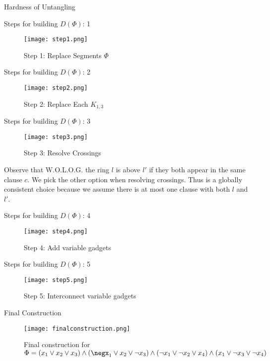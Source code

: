 \documentclass{beamer}
\begin{document}
\begin{section}{Hardness of Untangling}
    \begin{frame}{Steps for building $D(\Phi)$: 1}
        \begin{figure}
            \texttt{[image: step1.png]}
            \caption{Step 1: Replace Segments $\Phi$}
        \end{figure}
        
    \end{frame}{}
    
    \begin{frame}{Steps for building $D(\Phi)$: 2}
        \begin{figure}
            \texttt{[image: step2.png]}
            \caption{Step 2: Replace Each $K_{1,3}$ }
        \end{figure}
        
    \end{frame}{}
    
    \begin{frame}{Steps for building $D(\Phi)$: 3}
        \begin{figure}
            \texttt{[image: step3.png]}
            \caption{Step 3: Resolve Crossings}
        \end{figure}
        Observe that W.O.L.O.G. the ring $l$ is above $l'$ if they both appear in the same clause $c$. We pick the other option when resolving crossings. Thus is a globally consistent choice because we assume there is at most one clause with both $l$ and $l'$.   
    \end{frame}{}
    
    \begin{frame}{Steps for building $D(\Phi)$: 4}
        \begin{figure}
            \texttt{[image: step4.png]}
            \caption{Step 4: Add variable gadgets}
        \end{figure}
        
    \end{frame}{}
    
    \begin{frame}{Steps for building $D(\Phi)$: 5}
        \begin{figure}
            \texttt{[image: step5.png]}
            \caption{Step 5: Interconnect variable gadgets}
        \end{figure}
        
    \end{frame}{}
    
    \begin{frame}{Final Construction}
        \begin{figure}
            \texttt{[image: finalconstruction.png]}
            \caption{Final construction for $\Phi=(x_1\lor x_2 \lor x_3)\land(\negx_1\lor x_2 \lor \neg x_3)\land (\neg x_1\lor \neg x_2 \lor x_4)\land (x_1\lor \neg x_3 \lor \neg x_4)$}
        \end{figure}
    \end{frame}
    

\end{section}
\end{document}
